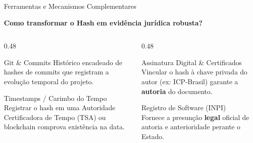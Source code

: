 \documentclass[9pt]{beamer}
\begin{document}
\begin{frame}{Ferramentas e Mecanismos Complementares}
  \begin{center}
    \small\bfseries Como transformar o Hash em evidência jurídica robusta?
  \end{center}

  \vspace{0.1cm}

  \begin{columns}[T]
    \begin{column}{0.48\textwidth}
      \begin{block}{Git \& Commits}
        \small
        Histórico encadeado de hashes de commits que registram a evolução temporal do projeto.
      \end{block}

      \begin{block}{Timestamps / Carimbo do Tempo}
        \small
        Registrar o hash em uma Autoridade Certificadora de Tempo (TSA) ou blockchain comprova existência na data.
      \end{block}
    \end{column}

    \begin{column}{0.48\textwidth}
      \begin{block}{Assinatura Digital \& Certificados}
        \small
        Vincular o hash à chave privada do autor (ex: ICP-Brasil) garante a \textbf{autoria} do documento.
      \end{block}

      \begin{block}{Registro de Software (INPI)}
        \small
        Fornece a presunção \textbf{legal} oficial de autoria e anterioridade perante o Estado.
      \end{block}
    \end{column}
  \end{columns}
\end{frame}
\end{document}

